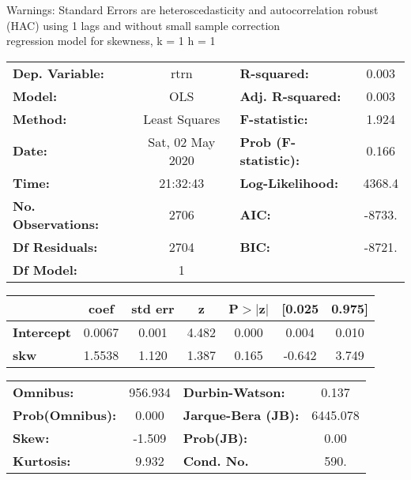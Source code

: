 Warnings: \newline
 [1] Standard Errors are heteroscedasticity and autocorrelation robust (HAC) using 1 lags and without small sample correction\\ 

regression model for skewness, k = 1 h = 1\begin{center}
\begin{tabular}{lclc}
\toprule
\textbf{Dep. Variable:}    &       rtrn       & \textbf{  R-squared:         } &     0.003   \\
\textbf{Model:}            &       OLS        & \textbf{  Adj. R-squared:    } &     0.003   \\
\textbf{Method:}           &  Least Squares   & \textbf{  F-statistic:       } &     1.924   \\
\textbf{Date:}             & Sat, 02 May 2020 & \textbf{  Prob (F-statistic):} &    0.166    \\
\textbf{Time:}             &     21:32:43     & \textbf{  Log-Likelihood:    } &    4368.4   \\
\textbf{No. Observations:} &        2706      & \textbf{  AIC:               } &    -8733.   \\
\textbf{Df Residuals:}     &        2704      & \textbf{  BIC:               } &    -8721.   \\
\textbf{Df Model:}         &           1      & \textbf{                     } &             \\
\bottomrule
\end{tabular}
\begin{tabular}{lcccccc}
                   & \textbf{coef} & \textbf{std err} & \textbf{z} & \textbf{P$> |$z$|$} & \textbf{[0.025} & \textbf{0.975]}  \\
\midrule
\textbf{Intercept} &       0.0067  &        0.001     &     4.482  &         0.000        &        0.004    &        0.010     \\
\textbf{skw}       &       1.5538  &        1.120     &     1.387  &         0.165        &       -0.642    &        3.749     \\
\bottomrule
\end{tabular}
\begin{tabular}{lclc}
\textbf{Omnibus:}       & 956.934 & \textbf{  Durbin-Watson:     } &    0.137  \\
\textbf{Prob(Omnibus):} &   0.000 & \textbf{  Jarque-Bera (JB):  } & 6445.078  \\
\textbf{Skew:}          &  -1.509 & \textbf{  Prob(JB):          } &     0.00  \\
\textbf{Kurtosis:}      &   9.932 & \textbf{  Cond. No.          } &     590.  \\
\bottomrule
\end{tabular}
\end{center}

